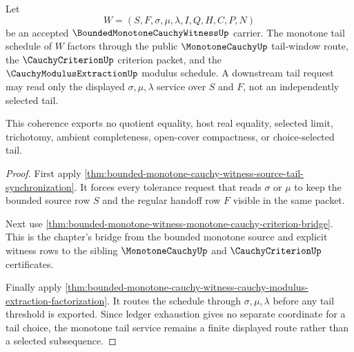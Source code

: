\begin{theorem}
\label{thm:bounded-monotone-cauchy-witness-monotone-tail-coherence}
Let
$$
W=(S,F,\sigma,\mu,\lambda,I,Q,H,C,P,N)
$$
be an accepted $\BoundedMonotoneCauchyWitnessUp$ carrier. The monotone tail schedule of $W$ factors through the public $\MonotoneCauchyUp$ tail-window route, the $\CauchyCriterionUp$ criterion packet, and the $\CauchyModulusExtractionUp$ modulus schedule. A downstream tail request may read only the displayed $\sigma,\mu,\lambda$ service over $S$ and $F$, not an independently selected tail.

This coherence exports no quotient equality, host real equality, selected limit, trichotomy, ambient completeness, open-cover compactness, or choice-selected tail.
\end{theorem}
\begin{proof}
First apply \autoref{thm:bounded-monotone-cauchy-witness-source-tail-synchronization}. It forces every tolerance request that reads $\sigma$ or $\mu$ to keep the bounded source row $S$ and the regular handoff row $F$ visible in the same packet.

Next use \autoref{thm:bounded-monotone-witness-monotone-cauchy-criterion-bridge}. This is the chapter's bridge from the bounded monotone source and explicit witness rows to the sibling $\MonotoneCauchyUp$ and $\CauchyCriterionUp$ certificates.

Finally apply \autoref{thm:bounded-monotone-cauchy-witness-cauchy-modulus-extraction-factorization}. It routes the schedule through $\sigma,\mu,\lambda$ before any tail threshold is exported. Since ledger exhaustion gives no separate coordinate for a tail choice, the monotone tail service remains a finite displayed route rather than a selected subsequence.
\end{proof}


